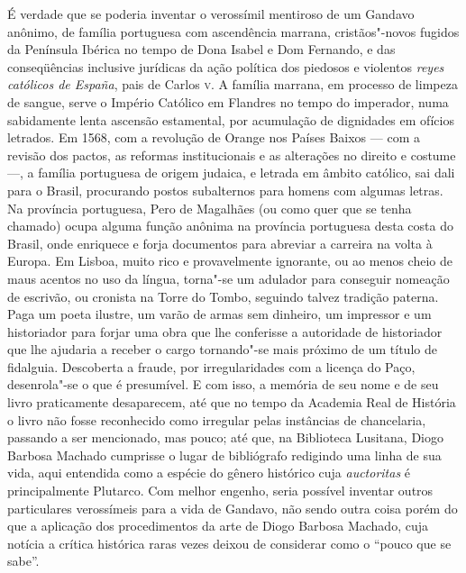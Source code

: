 É verdade que se poderia inventar o verossímil mentiroso de um Gandavo
anônimo, de família portuguesa com ascendência marrana, cristãos"-novos
fugidos da Península Ibérica no tempo de Dona Isabel e Dom Fernando, e
das conseqüências inclusive jurídicas da ação política dos piedosos e
violentos \textit{reyes católicos de España}, pais de Carlos \textsc{v}. A família
marrana, em processo de limpeza de sangue, serve o Império Católico em
Flandres no tempo do imperador, numa sabidamente lenta ascensão
estamental, por acumulação de dignidades em ofícios letrados. Em 1568,
com a revolução de Orange nos Países Baixos --- com a revisão dos pactos,
as reformas institucionais e as alterações no direito e costume ---, a
família portuguesa de origem judaica, e letrada em âmbito católico, sai
dali para o Brasil, procurando postos subalternos para homens com
algumas letras. Na província portuguesa, Pero de Magalhães (ou como
quer que se tenha chamado) ocupa alguma função anônima na província
portuguesa desta costa do Brasil, onde enriquece e forja documentos
para abreviar a carreira na volta à Europa. Em Lisboa, muito rico e
provavelmente ignorante, ou ao menos cheio de maus acentos no uso da
língua, torna"-se um adulador para conseguir nomeação de escrivão, ou
cronista na Torre do Tombo, seguindo talvez tradição paterna. Paga um
poeta ilustre, um varão de armas sem dinheiro, um impressor e um
historiador para forjar uma obra que lhe conferisse a autoridade de
historiador que lhe ajudaria a receber o cargo tornando"-se mais próximo
de um título de fidalguia. Descoberta a fraude, por irregularidades com
a licença do Paço, desenrola"-se o que é presumível. E com isso, a
memória de seu nome e de seu livro praticamente desaparecem, até que no
tempo da Academia Real de História o livro não fosse reconhecido como
irregular pelas instâncias de chancelaria, passando a ser mencionado,
mas pouco; até que, na Biblioteca  Lusitana, Diogo Barbosa Machado
cumprisse o lugar de bibliógrafo redigindo uma linha de sua vida, aqui
entendida como a espécie do gênero histórico cuja \textit{auctoritas} é
principalmente Plutarco. Com melhor engenho, seria possível inventar
outros particulares verossímeis para a vida de Gandavo, não sendo outra
coisa porém do que a aplicação dos procedimentos da arte de Diogo
Barbosa Machado, cuja notícia a crítica histórica raras vezes deixou de
considerar como o ``pouco que se sabe''.

